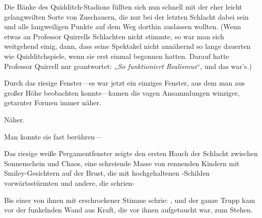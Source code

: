 Die Bänke des Quidditch-Stadions füllten sich nun schnell mit der eher leicht gelangweilten Sorte von Zuschauern, die nur bei der letzten Schlacht dabei sein und alle langweiligen Punkte auf dem Weg dorthin auslassen wollten. (Wenn etwas an Professor Quirrells Schlachten nicht stimmte, so war man sich weitgehend einig, dann, dass seine Spektakel nicht annähernd so lange dauerten wie Quidditchspiele, wenn sie erst einmal begonnen hatten. Darauf hatte Professor Quirrell nur geantwortet: „\emph{So funktioniert Realismus}“, und das war’s.)

Durch das riesige Fenster—es war jetzt ein einziges Fenster, aus dem man aus großer Höhe beobachten konnte—kamen die vagen Ansammlungen winziger, getarnter Formen immer näher.

Näher.

Man konnte sie fast berühren—

\later

Das riesige weiße Pergamentfenster zeigte den ersten Hauch der Schlacht zwischen Sonnenschein und Chaos, eine schreiende Masse von rennenden Kindern mit Smiley-Gesichtern auf der Brust, die mit hochgehaltenen -Schilden vorwärtsstürmten und andere, die  schrien-

Bis einer von ihnen mit erschrockener Stimme schrie: , und der ganze Trupp kam vor der funkelnden Wand aus Kraft, die vor ihnen aufgetaucht war, zum Stehen.

